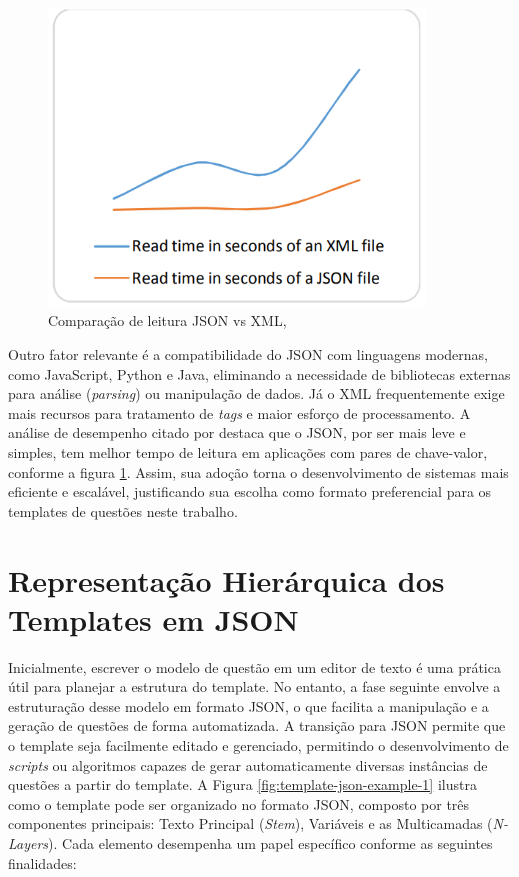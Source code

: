 \begin{figure}[ht]
	\centering
	\includegraphics[width=10cm]{./imagens/capitulo5/json-vs-xml}
	\caption{Comparação de leitura JSON vs XML, \parencite{goyal2017} }
	\label{fig:json-vs-xml}
\end{figure}

Outro fator relevante é a compatibilidade do JSON com linguagens modernas, como JavaScript, Python e Java, eliminando a necessidade de bibliotecas externas para análise (\textit{parsing}) ou manipulação de dados. Já o XML frequentemente exige mais recursos para tratamento de \textit{tags} e maior esforço de processamento. A análise de desempenho citado por \parencite{goyal2017} destaca que o JSON, por ser mais leve e simples, tem melhor tempo de leitura em aplicações com pares de chave-valor, conforme a figura \ref{fig:json-vs-xml}. Assim, sua adoção torna o desenvolvimento de sistemas mais eficiente e escalável, justificando sua escolha como formato preferencial para os templates de questões neste trabalho.


\section{Representação Hierárquica dos Templates em JSON}

Inicialmente, escrever o modelo de questão em um editor de texto é uma prática útil para planejar a estrutura do template. No entanto, a fase seguinte envolve a estruturação desse modelo em formato JSON, o que facilita a manipulação e a geração de questões de forma automatizada. A transição para JSON permite que o template seja facilmente editado e gerenciado, permitindo o desenvolvimento de \textit{scripts} ou algoritmos capazes de gerar automaticamente diversas instâncias de questões a partir do template.
A Figura \ref{fig:template-json-example-1} ilustra como o template pode ser organizado no formato JSON, composto por três componentes principais: Texto Principal (\textit{Stem}), Variáveis e as Multicamadas (\textit{N-Layers}). Cada elemento desempenha um papel específico conforme as seguintes finalidades:


